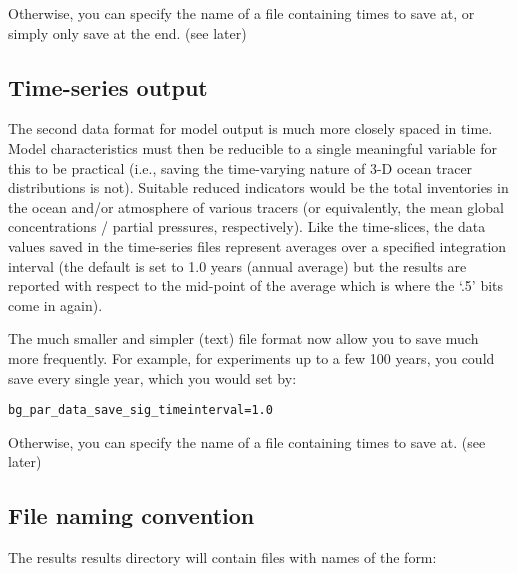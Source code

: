 \noindent Otherwise, you can specify the name of a file containing times to save at, or simply only save at the end. (see later)

\newpage

\subsection{Time-series output}

The second data format for model output is much more closely spaced in time. Model characteristics must then be reducible to a single meaningful variable for this to be practical (i.e., saving the time-varying nature of 3-D ocean tracer distributions is not). Suitable reduced indicators would be the total inventories in the ocean and/or atmosphere of various tracers (or equivalently, the mean global concentrations / partial pressures, respectively). Like the time-slices, the data values saved in the time-series files represent averages over a specified integration interval (the default is set to 1.0 years (annual average) but the results are reported with respect to the mid-point of the average which is where the ‘.5’ bits come in again).

The much smaller and simpler (text) file format now allow you to save much more frequently. For example, for experiments up to a few 100 years, you could save every single year, which you would set by:

\vspace{-1mm}
\small\begin{verbatim}
bg_par_data_save_sig_timeinterval=1.0
\end{verbatim}\normalsize
\vspace{-1mm}

\noindent Otherwise, you can specify the name of a file containing times to save at. (see later)


\subsection{File naming convention}

The \textsf{\footnotesize results} results directory will contain files with names of the form:

